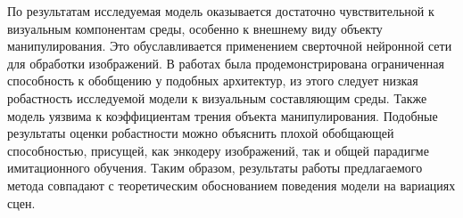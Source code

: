            \begin{table}[ht]
              \caption{Результаты валидации модели BC на задаче с отрытием шкафа}
              \label{res-Table1}
              
            \end{table}
           
            По результатам исследуемая модель оказывается достаточно чувствительной к визуальным компонентам среды, особенно к внешнему виду объекту манипулирования. Это обуславливается применением сверточной нейронной сети для обработки изображений. В работах \cite{rangel2024survey, zhang2016understanding} была продемонстрирована ограниченная способность к обобщению у подобных архитектур, из этого следует низкая робастность исследуемой модели к визуальным составляющим среды.
            Также модель уязвима к коэффициентам трения объекта манипулирования. Подобные результаты оценки робастности можно объяснить плохой обобщающей способностью, присущей, как энкодеру изображений, так и общей парадигме имитационного обучения. Таким образом, результаты работы предлагаемого метода совпадают с теоретическим обоснованием поведения модели на вариациях сцен. 

